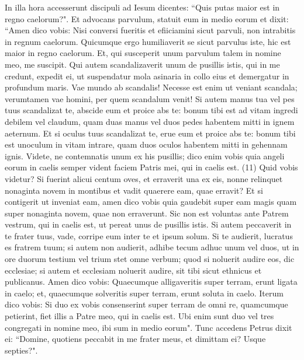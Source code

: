 \begin{biblechapter}  
\verse In illa hora accesserunt discipuli ad Iesum dicentes: “Quis putas maior est in regno caelorum?". 
\verse Et advocans parvulum, statuit eum in medio eorum  
\verse et dixit: “Amen dico vobis: Nisi conversi fueritis et efiiciamini sicut parvuli, non intrabitis in regnum caelorum. 
\verse Quicumque ergo humiliaverit se sicut parvulus iste, hic est maior in regno caelorum. 
\verse Et, qui susceperit unum parvulum talem in nomine meo, me suscipit. 
\verse Qui autem scandalizaverit unum de pusillis istis, qui in me credunt, expedit ei, ut suspendatur mola asinaria in collo eius et demergatur in profundum maris. 
\verse Vae mundo ab scandalis! Necesse est enim ut veniant scandala; verumtamen vae homini, per quem scandalum venit! 
\verse Si autem manus tua vel pes tuus scandalizat te, abscide eum et proice abs te: bonum tibi est ad vitam ingredi debilem vel claudum, quam duas manus vel duos pedes habentem mitti in ignem aeternum. 
\verse Et si oculus tuus scandalizat te, erue eum et proice abs te: bonum tibi est unoculum in vitam intrare, quam duos oculos habentem mitti in gehennam ignis. 
\verse Videte, ne contemnatis unum ex his pusillis; dico enim vobis quia angeli eorum in caelis semper vident faciem Patris mei, qui in caelis est. (11) 
\verse Quid vobis videtur? Si fuerint alicui centum oves, et erraverit una ex eis, nonne relinquet nonaginta novem in montibus et vadit quaerere eam, quae erravit? 
\verse Et si contigerit ut inveniat eam, amen dico vobis quia gaudebit super eam magis quam super nonaginta novem, quae non erraverunt. 
\verse Sic non est voluntas ante Patrem vestrum, qui in caelis est, ut pereat unus de pusillis istis. 
\verse Si autem peccaverit in te frater tuus, vade, corripe eum inter te et ipsum solum. Si te audierit, lucratus es fratrem tuum; 
\verse si autem non audierit, adhibe tecum adhuc unum vel duos, ut in ore duorum testium vel trium stet omne verbum; 
\verse quod si noluerit audire eos, dic ecclesiae; si autem et ecclesiam noluerit audire, sit tibi sicut ethnicus et publicanus. 
\verse Amen dico vobis: Quaecumque alligaveritis super terram, erunt ligata in caelo; et, quaecumque solveritis super terram, erunt soluta in caelo. 
\verse Iterum dico vobis: Si duo ex vobis consenserint super terram de omni re, quamcumque petierint, fiet illis a Patre meo, qui in caelis est. 
\verse Ubi enim sunt duo vel tres congregati in nomine meo, ibi sum in medio eorum". 
\verse Tunc accedens Petrus dixit ei: “Domine, quotiens peccabit in me frater meus, et dimittam ei? Usque septies?". 

\end{biblechapter}
